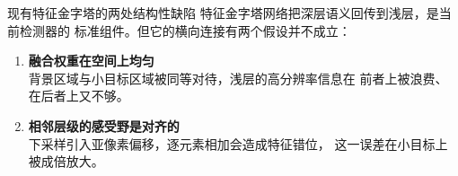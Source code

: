 \begin{frame}{现有特征金字塔的两处结构性缺陷}
  特征金字塔网络\cite{lin2017fpn}把深层语义回传到浅层，是当前检测器的
  标准组件。但它的横向连接有两个假设并不成立：

  \vspace{0.8em}
  \begin{enumerate}
    \setlength{\itemsep}{0.9em}
    \item<1-> \textbf{融合权重在空间上均匀}\\
      {\small 背景区域与小目标区域被同等对待，浅层的高分辨率信息在
       前者上被浪费、在后者上又不够。}
    \item<2-> \textbf{相邻层级的感受野是对齐的}\\
      {\small 下采样引入亚像素偏移，逐元素相加会造成特征错位，
       这一误差在小目标上被成倍放大。}
  \end{enumerate}

  \vspace{0.8em}

\end{frame}
